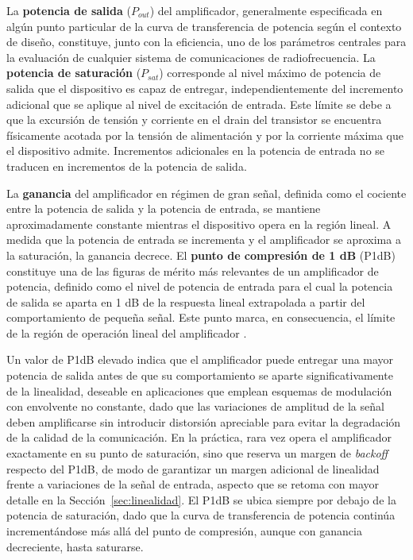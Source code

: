 La \textbf{potencia de salida} ($P_{out}$) del amplificador, generalmente especificada en algún punto particular de la curva de transferencia de potencia según el contexto de diseño, constituye, junto con la eficiencia, uno de los parámetros centrales para la evaluación de cualquier sistema de comunicaciones de radiofrecuencia. La \textbf{potencia de saturación} ($P_{sat}$) corresponde al nivel máximo de potencia de salida que el dispositivo es capaz de entregar, independientemente del incremento adicional que se aplique al nivel de excitación de entrada. Este límite se debe a que la excursión de tensión y corriente en el drain del transistor se encuentra físicamente acotada por la tensión de alimentación y por la corriente máxima que el dispositivo admite. Incrementos adicionales en la potencia de entrada no se traducen en incrementos de la potencia de salida.

La \textbf{ganancia} del amplificador en régimen de gran señal, definida como el cociente entre la potencia de salida y la potencia de entrada, se mantiene aproximadamente constante mientras el dispositivo opera en la región lineal. A medida que la potencia de entrada se incrementa y el amplificador se aproxima a la saturación, la ganancia decrece. El \textbf{punto de compresión de 1 dB} (P1dB) constituye una de las figuras de mérito más relevantes de un amplificador de potencia, definido como el nivel de potencia de entrada para el cual la potencia de salida se aparta en 1 dB de la respuesta lineal extrapolada a partir del comportamiento de pequeña señal. Este punto marca, en consecuencia, el límite de la región de operación lineal del amplificador \cite[pp.~512--513]{pozar2011}.

Un valor de P1dB elevado indica que el amplificador puede entregar una mayor potencia de salida antes de que su comportamiento se aparte significativamente de la linealidad, deseable en aplicaciones que emplean esquemas de modulación con envolvente no constante, dado que las variaciones de amplitud de la señal deben amplificarse sin introducir distorsión apreciable para evitar la degradación de la calidad de la comunicación. En la práctica, rara vez opera el amplificador exactamente en su punto de saturación, sino que reserva un margen de \textit{backoff} respecto del P1dB, de modo de garantizar un margen adicional de linealidad frente a variaciones de la señal de entrada, aspecto que se retoma con mayor detalle en la Sección~\ref{sec:linealidad}. El P1dB se ubica siempre por debajo de la potencia de saturación, dado que la curva de transferencia de potencia continúa incrementándose más allá del punto de compresión, aunque con ganancia decreciente, hasta saturarse.

